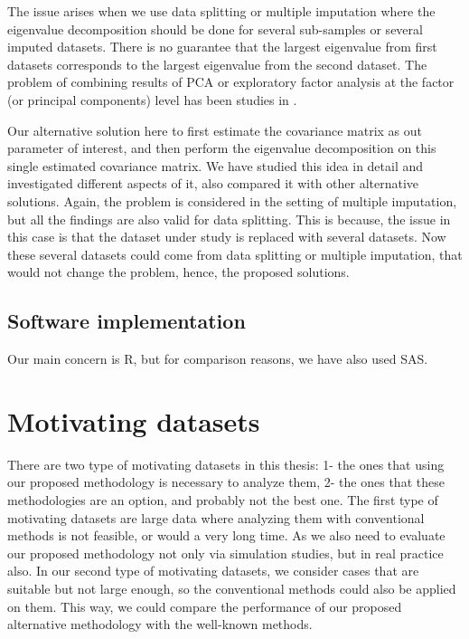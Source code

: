\documentclass[11pt,a5paper,twoside]{book}
\begin{document}
The issue arises when we use data splitting or multiple imputation where the eigenvalue decomposition should be done for several sub-samples or several imputed datasets. There is no guarantee that the largest eigenvalue from first datasets corresponds to the largest eigenvalue from the second dataset. The problem of combining results of PCA or exploratory factor analysis at the factor (or principal components) level has been studies in \cite{lovik2017combining}. 

Our alternative solution here to first estimate the covariance matrix as out parameter of interest, and then perform the eigenvalue decomposition on this single estimated covariance matrix. We have studied this idea in detail and investigated different aspects of it, also compared it with other alternative solutions. Again, the problem is considered in the setting of multiple imputation, but all the findings are also valid for data splitting. This is because, the issue in this case is that the dataset under study is replaced with several datasets. Now these several datasets could come from data splitting or multiple imputation, that would not change the problem, hence, the proposed solutions.




\section{Software implementation}

Our main concern is R, but for comparison reasons, we have also used SAS.


\chapter{Motivating datasets}
\label{sec_data_sets}

There are two type of motivating datasets in this thesis: 1- the ones that using our proposed methodology is necessary to analyze them, 2- the ones that these methodologies are an option, and probably not the best one. The first type of motivating datasets are large data where analyzing them with conventional methods is not feasible, or would a very long time. As we also need to evaluate our proposed methodology not only via simulation studies, but in real practice also. In our second type of motivating datasets, we consider cases that are suitable but not large enough, so the conventional methods could also be applied on them. This way, we could compare the performance of our proposed alternative methodology with the well-known methods.
\end{document}

